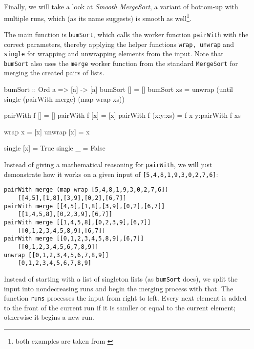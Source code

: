 Finally, we will take a look at \emph{Smooth MergeSort}, a variant of bottom-up with multiple runs, which (as its name suggests) is smooth as well\footnote{both examples are taken from \autocite[section 5.2]{adwh20}}.

\begin{impl}
The main function is \texttt{bumSort}, which calls the worker function \texttt{pairWith} with the correct parameters, thereby applying the helper functions \texttt{wrap, unwrap} and \texttt{single} for wrapping and unwrapping elements from the input.
Note that \texttt{bumSort} also uses the \texttt{merge} worker function from the standard \texttt{MergeSort} for merging the created pairs of lists.
\end{impl}

\begin{haskellcode}
bumSort :: Ord a => [a] -> [a]
bumSort [] = []
bumSort xs = unwrap (until single (pairWith merge) (map wrap xs))

pairWith f [] = []
pairWith f [x] = [x]
pairWith f (x:y:xs) = f x y:pairWith f xs

wrap x = [x]
unwrap [x] = x

single [x]  = True
single _    = False
\end{haskellcode}

Instead of giving a mathematical reasoning for \texttt{pairWith}, we will just demonstrate how it works on a given input of \texttt{[5,4,8,1,9,3,0,2,7,6]}:
\begin{verbatim}
pairWith merge (map wrap [5,4,8,1,9,3,0,2,7,6])
    [[4,5],[1,8],[3,9],[0,2],[6,7]]
pairWith merge [[4,5],[1,8],[3,9],[0,2],[6,7]]
    [[1,4,5,8],[0,2,3,9],[6,7]]
pairWith merge [[1,4,5,8],[0,2,3,9],[6,7]]
    [[0,1,2,3,4,5,8,9],[6,7]]
pairWith merge [[0,1,2,3,4,5,8,9],[6,7]]
    [[0,1,2,3,4,5,6,7,8,9]]
unwrap [[0,1,2,3,4,5,6,7,8,9]]
    [0,1,2,3,4,5,6,7,8,9]
\end{verbatim}

\begin{impl}
Instead of starting with a list of singleton lists (as \texttt{bumSort} does), we split the input into nondecreasing runs and begin the merging process with that.
The function \texttt{runs} processes the input from right to left.
Every next element is added to the front of the current run if it is samller or equal to the current element; otherwise it begins a new run.
\end{impl}

